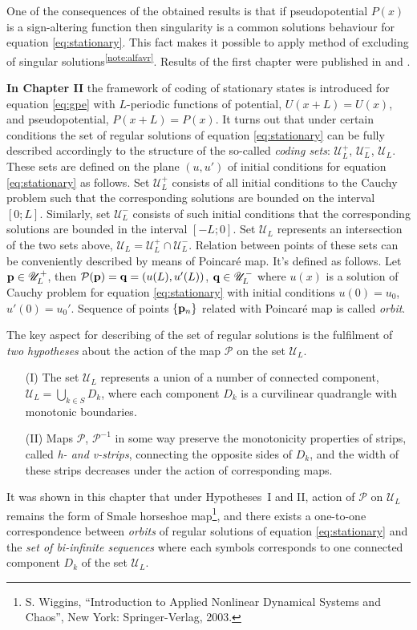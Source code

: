 \documentclass[candidate, href, colorlinks]{disser}
\begin{document}
One of the consequences of the obtained results is that if pseudopotential $P(x)$ is a sign-altering function then singularity is a common solutions behaviour for equation \eqref{eq:stationary}.
This fact makes it possible to apply method of excluding of singular solutions\textsuperscript{\ref{note:alfavr}}.
Results of the first chapter were published in \cite{AlfimovLebedev} and \cite{Ufa2015}.

\textbf{In Chapter II} the framework of coding of stationary states is introduced for equation \eqref{eq:gpe} with $L$-periodic functions of potential, $U(x + L) = U(x)$, and pseudopotential, $P(x + L) = P(x)$.
It turns out that under certain conditions the set of regular solutions of equation \eqref{eq:stationary} can be fully described accordingly to the structure of the so-called {\it coding sets}: $\mathscr{U}_L^+$, $\mathscr{U}_L^-$, $\mathscr{U}_L$.
These sets are defined on the plane $(u, u')$ of initial conditions for equation \eqref{eq:stationary} as follows.
Set $\mathscr{U}_L^+$ consists of all initial conditions to the Cauchy problem such that the corresponding solutions are bounded on the interval $[0; L]$.
Similarly, set $\mathscr{U}_L^-$ consists of such initial conditions that the corresponding solutions are bounded in the interval $[-L; 0]$.
Set $\mathscr{U}_L$ represents an intersection of the two sets above, $\mathscr{U}_L = \mathscr{U}_L^+ \cap \mathscr{U}_L^-$.
Relation between points of these sets can be conveniently described by means of Poincar\'e map.
It's defined as follows.
Let $\vb{p} \in \mathscr{U}_L^+$, then $\mathcal{P} (\vb{p}) = \vb{q} = (u(L), u'(L))$, $\vb{q} \in \mathscr{U}_L^-$ where $u(x)$ is a solution of Cauchy problem for equation \eqref{eq:stationary} with initial conditions $u(0) = u_0$, $u'(0) = u_0'$.
Sequence of points $\{ \vb{p}_n \}$ related with Poincar\'e map is called {\it orbit}.

The key aspect for describing of the set of regular solutions is the fulfilment of {\it two hypotheses} about the action of the map $\mathcal{P}$ on the set $\mathscr{U}_L$.
\begin{itemize}
	\item[(I)] The set $\mathscr{U}_L$ represents a union of a number of connected component, $\mathscr{U}_L = \bigcup_{k \in S} D_k$, where each component $D_k$ is a curvilinear quadrangle with monotonic boundaries.
	\item[(II)] Maps $\mathcal{P}$, $\mathcal{P}^{-1}$ in some way preserve the monotonicity properties of strips, called {\it h- and v-strips}, connecting the opposite sides of $D_k$, and the width of these strips decreases under the action of corresponding maps.
\end{itemize}
It was shown in this chapter that under Hypotheses~I and II, action of $\mathcal{P}$ on $\mathscr{U}_L$ remains the form of Smale horseshoe map\footnote{S. Wiggins, ``Introduction to Applied Nonlinear Dynamical Systems and Chaos'', New York: Springer-Verlag, 2003.}, and there exists a one-to-one correspondence between {\it orbits} of regular solutions of equation \eqref{eq:stationary} and the {\it set of bi-infinite sequences} where each symbols corresponds to one connected component $D_k$ of the set $\mathscr{U}_L$.
\end{document}
